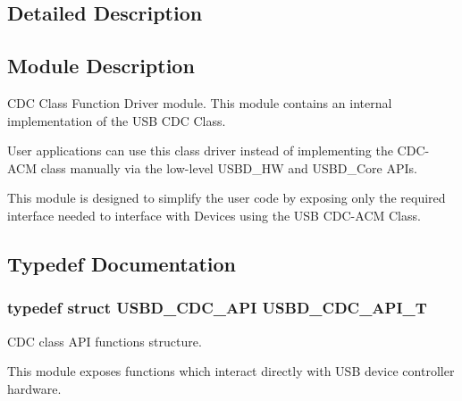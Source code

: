 \subsection{Detailed Description}
\hypertarget{group__USBD__CDC_Sec_CDCModDescription}{}\subsection{Module Description}\label{group__USBD__CDC_Sec_CDCModDescription}
C\-D\-C Class Function Driver module. This module contains an internal implementation of the U\-S\-B C\-D\-C Class.

User applications can use this class driver instead of implementing the C\-D\-C-\/\-A\-C\-M class manually via the low-\/level U\-S\-B\-D\-\_\-\-H\-W and U\-S\-B\-D\-\_\-\-Core A\-P\-Is.

This module is designed to simplify the user code by exposing only the required interface needed to interface with Devices using the U\-S\-B C\-D\-C-\/\-A\-C\-M Class. 

\subsection{Typedef Documentation}
\hypertarget{group__USBD__CDC_gaad7f61aed01ad4130bee0f50b17eb716}{
\subsubsection[{U\-S\-B\-D\-\_\-\-C\-D\-C\-\_\-\-A\-P\-I\-\_\-\-T}]{\setlength{\rightskip}{0pt plus 5cm}typedef struct {\bf U\-S\-B\-D\-\_\-\-C\-D\-C\-\_\-\-A\-P\-I}  {\bf U\-S\-B\-D\-\_\-\-C\-D\-C\-\_\-\-A\-P\-I\-\_\-\-T}}}\label{group__USBD__CDC_gaad7f61aed01ad4130bee0f50b17eb716}


C\-D\-C class A\-P\-I functions structure.

This module exposes functions which interact directly with U\-S\-B device controller hardware. 

